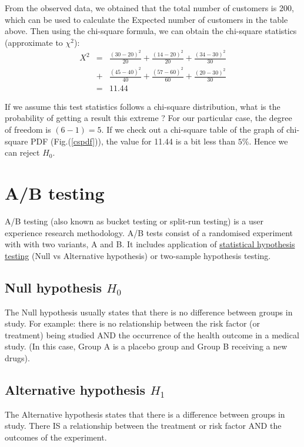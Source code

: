 From the observed data, we obtained that the total number of customers is 200, which can be used to calculate the Expected number of customers in the table above. Then using the chi-square formula, we can obtain the chi-square statistics (approximate to $\chi^2$):
\begin{eqnarray}
X^2 &=& \frac{(30-20)^2}{20} + \frac{(14-20)^2}{20} + \frac{(34-30)^2}{30} \\ \nonumber
       &+&\frac{(45-40)^2}{40} + \frac{(57-60)^2}{60} + \frac{(20-30)^2}{30} \\ \nonumber
       &=& 11.44
\end{eqnarray}

If we assume this test statistics follows a chi-square distribution, what is the probability of getting a result this extreme ? For our particular case, the degree of freedom is $(6-1)=5$. If we check out a chi-square table of the graph of chi-square PDF (Fig.(\ref{cspdf})), the value for 11.44 is a bit less than $5\%$. Hence we can reject $H_0$.

\section{A/B testing}
\label{abtest}

A/B testing (also known as bucket testing or split-run testing) is a user experience research methodology. A/B tests consist of a randomised experiment with with two variants, A and B. It includes application of \underline{statistical hypothesis testing} (Null vs Alternative hypothesis) or two-sample hypothesis testing. \\


\subsection{Null hypothesis $H_0$}

The Null hypothesis usually states that there is no difference between groups in study. For example: there is no relationship between the risk factor (or treatment) being studied AND the occurrence of the health outcome in a medical study. (In this case, Group A is a placebo group and Group B receiving a new drugs).

\subsection{Alternative hypothesis $H_1$}

The Alternative hypothesis states that there is a difference between groups in study. There IS a relationship between the treatment or risk factor AND the outcomes of the experiment.\\

